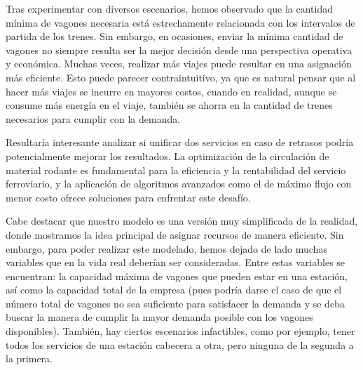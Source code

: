 \documentclass{article}
\begin{document}
Tras experimentar con diversos escenarios, hemos observado que la cantidad mínima de vagones necesaria está estrechamente relacionada con los intervalos de partida de los trenes. Sin embargo, en ocasiones, enviar la mínima cantidad de vagones no siempre resulta ser la mejor decisión desde una perspectiva operativa y económica. Muchas veces, realizar más viajes puede resultar en una asignación más eficiente. Esto puede parecer contraintuitivo, ya que es natural pensar que al hacer más viajes se incurre en mayores costos, cuando en realidad, aunque se consume más energía en el viaje, también se ahorra en la cantidad de trenes necesarios para cumplir con la demanda.

Resultaría interesante analizar si unificar dos servicios en caso de retrasos podría potencialmente mejorar los resultados. La optimización de la circulación de material rodante es fundamental para la eficiencia y la rentabilidad del servicio ferroviario, y la aplicación de algoritmos avanzados como el de máximo flujo con menor costo ofrece soluciones para enfrentar este desafío.

Cabe destacar que nuestro modelo es una versión muy simplificada de la realidad, donde mostramos la idea principal de asignar recursos de manera eficiente. Sin embargo, para poder realizar este modelado, hemos dejado de lado muchas variables que en la vida real deberían ser consideradas. Entre estas variables se encuentran: la capacidad máxima de vagones que pueden estar en una estación, así como la capacidad total de la empresa (pues podría darse el caso de que el número total de vagones no sea suficiente para satisfacer la demanda y se deba buscar la manera de cumplir la mayor demanda posible con los vagones disponibles). También, hay ciertos escenarios infactibles, como por ejemplo, tener todos los servicios de una estación cabecera a otra, pero ninguna de la segunda a la primera. 
\end{document}
